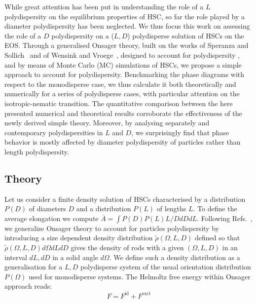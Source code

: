 \documentclass[journal=jacsat,manuscript=article]{achemso}
\begin{document}
While great attention has been put in understanding the role of a $L$ polydispersity on the equilibrium properties of HSC, so far the  role played by  a diameter polydispersity has been neglected. We thus focus this work on assessing the role of a $D$ polydispersity on a ($L,D$) polydisperse solution of HSCs on the EOS.
Through a generalised Onsager theory, built on the works of Speranza and Sollich~\cite{Speranza2002}
and of Wensink and Vroege~\cite{Wensink2003}, designed to account for polydispersity , and by means of Monte Carlo (MC) simulations of HSCs, we propose a simple approach to account for polydispersity. 
Benchmarking the phase diagrams with  respect to the monodisperse case, we thus calculate it both theoretically and numerically for a series of polydisperse cases, with particular attention on the  isotropic-nematic transition.
The quantitative comparison between the here presented numerical and theoretical results corroborate the effectiveness of the newly derived simple theory.
Moreover, by analysing separately and contemporary  polydispersities in $L$ and $D$, we surprisingly find that phase behavior is mostly affected by diameter polydispersity of particles rather than length polydispersity. 


\subsection{Theory} \label{sec:Theory}
Let us consider a finite density solution of HSCs  characterised by a distribution $P(D)$ of diameters $D$ and a distribution $P(L)$ of lengths $L$.  To define the average elongation we compute $\overline{A}= \int P(D) P(L) L/D dD dL$.
Following Refs.~\cite{Speranza2002,Wensink2003}, we generalize Onsager theory to account for particles polydispersity by introducing a 
size dependent density distribution $\tilde{\rho}(\Omega,L,D)$ defined so that $\tilde{\rho}(\Omega,L,D)d\Omega dL dD $ gives the density of rods with a given $(\Omega,L,D)$ in an interval $dL, dD$ in a solid angle  $d\Omega$. We define such a density distribution as a generalisation for a $L,D$ polydisperse system of the usual orientation distribution $P(\Omega)$ used for monodisperse systems.
The Helmoltz free energy within Onsager approach reads:
\begin{equation}
	F = F^\mathrm{id} + F^\mathrm{excl}
\end{equation}
\end{document}
